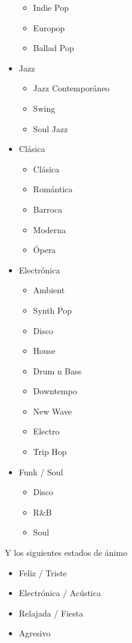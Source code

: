 \begin{itemize}
  \begin{itemize}
  \item
    Indie Pop
  \item
    Europop
  \item
    Ballad Pop
  \end{itemize}
\item
  Jazz

  \begin{itemize}
  \item
    Jazz Contemporáneo
  \item
    Swing
  \item
    Soul Jazz
  \end{itemize}
\item
  Clásica

  \begin{itemize}
  \item
    Clásica
  \item
    Romántica
  \item
    Barroca
  \item
    Moderna
  \item
    Ópera
  \end{itemize}
\item
  Electrónica

  \begin{itemize}
  \item
    Ambient
  \item
    Synth Pop
  \item
    Disco
  \item
    House
  \item
    Drum n Bass
  \item
    Downtempo
  \item
    New Wave
  \item
    Electro
  \item
    Trip Hop
  \end{itemize}
\item
  Funk / Soul

  \begin{itemize}
  \item
    Disco
  \item
    R\&B
  \item
    Soul
  \end{itemize}
\end{itemize}

Y los siguientes estados de ánimo

\begin{itemize}
\itemsep0em
\item
  Feliz / Triste
\item
  Electrónica / Acústica
\item
  Relajada / Fiesta
\item
  Agresivo
\end{itemize}

